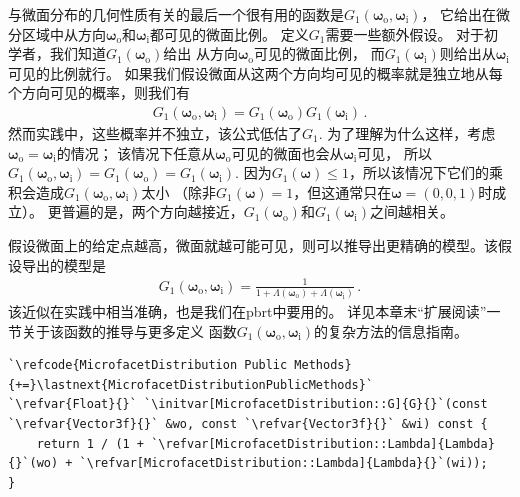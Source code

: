 与微面分布的几何性质有关的最后一个很有用的函数是$G_1({\bm\omega}_{\mathrm{o}},{\bm\omega}_{\mathrm{i}})$，
它给出在微分区域中从方向${\bm\omega}_{\mathrm{o}}$和${\bm\omega}_{\mathrm{i}}$都可见的微面比例。
定义$G_1$需要一些额外假设。
对于初学者，我们知道$G_1({\bm\omega}_{\mathrm{o}})$给出
从方向${\bm\omega}_{\mathrm{o}}$可见的微面比例，
而$G_1({\bm\omega}_{\mathrm{i}})$则给出从${\bm\omega}_{\mathrm{i}}$可见的比例就行。
如果我们假设微面从这两个方向均可见的概率就是独立地从每个方向可见的概率，则我们有
\begin{align*}
    G_1({\bm\omega}_{\mathrm{o}},{\bm\omega}_{\mathrm{i}})=G_1({\bm\omega}_{\mathrm{o}})G_1({\bm\omega}_{\mathrm{i}})\, .
\end{align*}
然而实践中，这些概率并不独立，该公式低估了$G_1$.
为了理解为什么这样，考虑${\bm\omega}_{\mathrm{o}}={\bm\omega}_{\mathrm{i}}$的情况；
该情况下任意从${\bm\omega}_{\mathrm{o}}$可见的微面也会从${\bm\omega}_{\mathrm{i}}$可见，
所以$G_1({\bm\omega}_{\mathrm{o}},{\bm\omega}_{\mathrm{i}})=G_1({\bm\omega}_{\mathrm{o}})=G_1({\bm\omega}_{\mathrm{i}})$.
因为$G_1({\bm\omega})\le 1$，所以该情况下它们的乘积会造成$G_1({\bm\omega}_{\mathrm{o}},{\bm\omega}_{\mathrm{i}})$太小
（除非$G_1({\bm\omega})=1$，但这通常只在${\bm\omega}=(0,0,1)$时成立）。
更普遍的是，两个方向越接近，$G_1({\bm\omega}_{\mathrm{o}})$和$G_1({\bm\omega}_{\mathrm{i}})$之间越相关。

假设微面上的给定点越高，微面就越可能可见，则可以推导出更精确的模型。该假设导出的模型是
\begin{align*}
    G_1({\bm\omega}_{\mathrm{o}},{\bm\omega}_{\mathrm{i}})=\frac{1}{1+\Lambda({\bm\omega}_{\mathrm{o}})+\Lambda({\bm\omega}_{\mathrm{i}})}\, .
\end{align*}
该近似在实践中相当准确，也是我们在pbrt中要用的。
详见本章末“扩展阅读”一节关于该函数的推导与更多定义
函数$G_1({\bm\omega}_{\mathrm{o}},{\bm\omega}_{\mathrm{i}})$的复杂方法的信息指南。
\begin{lstlisting}
`\refcode{MicrofacetDistribution Public Methods}{+=}\lastnext{MicrofacetDistributionPublicMethods}`
`\refvar{Float}{}` `\initvar[MicrofacetDistribution::G]{G}{}`(const `\refvar{Vector3f}{}` &wo, const `\refvar{Vector3f}{}` &wi) const {
    return 1 / (1 + `\refvar[MicrofacetDistribution::Lambda]{Lambda}{}`(wo) + `\refvar[MicrofacetDistribution::Lambda]{Lambda}{}`(wi));
}
\end{lstlisting}

